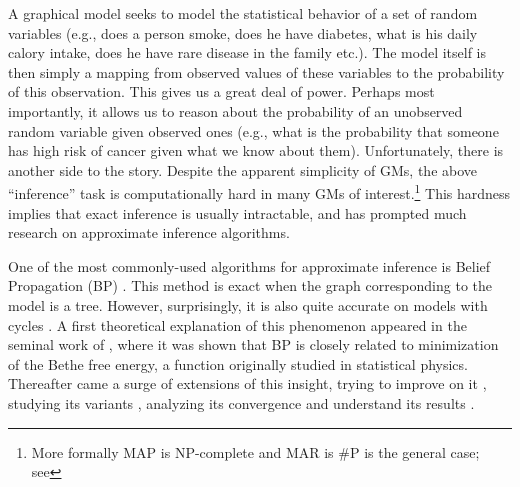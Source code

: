 A graphical model seeks to model the statistical behavior of a set of random variables (e.g., does a person smoke, does he have diabetes, what is his daily calory intake, does he have rare disease in the family etc.). %
 The model itself is then simply a mapping from observed values of these variables to the probability of this observation. This gives us a great deal of power. Perhaps most importantly, it allows us to reason about the probability of an unobserved random variable given observed ones (e.g., what is the probability that someone has high risk of cancer given what we know about them). Unfortunately, there is another side to the story. Despite the apparent simplicity of GMs, the above ``inference'' task is computationally hard in many GMs of interest.\footnote{More formally MAP is NP-complete and MAR is \#P is the general case; see } This hardness implies that exact inference is usually intractable, and has prompted much research on approximate inference algorithms.

One of the most commonly-used algorithms for approximate inference is Belief Propagation (BP) \cite{pearl1986fusion}.
This method is exact when the graph corresponding to the model is a tree. However, surprisingly, it is also quite accurate on models with cycles \cite{willsky2002multiresolution,loeliger2004introduction,kschischang2003codes}.
 A first theoretical explanation of this phenomenon appeared in the seminal work of \cite{yedidia2000generalized}, where it was shown that BP is closely related to minimization of the Bethe free energy, a function originally studied in statistical physics. Thereafter came a surge of extensions of this insight, trying to improve on it \cite{elidan2012residual}, studying its variants \cite{welling2001belief, wainwright2003tree, meshi2009convexifying}, analyzing its convergence \cite{tatikonda2002loopy, mooij2007sufficient, roosta2008convergence} and understand its results \cite{heskes2002stable, yedidia2005constructing, AlanNips2007, YusukeNips2009, RuozziNips2012}.

